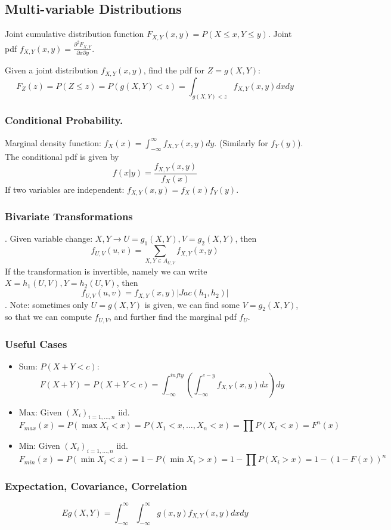 \documentclass[12pt]{amsart}
\numberwithin{equation}{section}
\theoremstyle{plain}
\theoremstyle{definition}
\begin{document}
\subsection{Multi-variable Distributions}
Joint cumulative distribution function $F_{X,Y}(x,y) = P(X\leq x, Y\leq y)$. Joint pdf $f_{X,Y}(x,y) = \frac{\partial^2F_{X,Y}}{\partial x\partial y}$.


Given a joint distribution $f_{X,Y}(x,y)$, find the pdf for $Z=g(X,Y)$:
$$
F_Z(z) = P(Z\leq z) = P(g(X,Y)<z)=\int_{g(X,Y)<z}f_{X,Y}(x,y)dxdy
$$

\subsubsection{Conditional Probability.}

Marginal density function: $f_X(x) = \int_{-\infty}^{\infty}f_{X,Y}(x,y)dy$. (Similarly for $f_Y(y)$). The conditional pdf is given by
$$
f(x|y) = \frac{f_{X,Y}(x,y)}{f_X(x)}
$$
If two variables are independent: $f_{X,Y}(x,y)=f_X(x)f_Y(y)$.

\subsubsection{Bivariate Transformations}. Given variable change: $X,Y\to U = g_1(X,Y), V=g_2(X,Y)$, then 
$$
f_{U,V}(u,v) = \sum_{X,Y\in A_{U,V}}f_{X,Y}(x,y)
$$
If the transformation is invertible, namely we can write $X = h_1(U,V), Y = h_2(U,V)$, then
$$
f_{U,V}(u,v) = f_{X,Y}(x,y)|Jac(h_1,h_2)|
$$.
Note: sometimes only $U = g(X,Y)$ is given, we can find some $V=g_2(X,Y)$, so that we can compute $f_{U,V}$, and further find the marginal pdf $f_U$.

\subsubsection{Useful Cases} 
\begin{itemize}
\item Sum: $P(X+Y<c)$:
$$
F(X+Y) = P(X+Y<c) = \int_{-\infty}^{infty}(\int_{-\infty}^{c-y}f_{X,Y}(x,y)dx)dy
$$
\item Max: Given $(X_i)_{i = 1,\ldots, n}$ iid. 
$$F_{max}(x) = P(\max X_i<x) = P(X_1<x, \ldots, X_n<x) = \prod P(X_i<x)=F^n(x)$$
\item Min: Given $(X_i)_{i = 1,\ldots, n}$ iid. 
$$
F_{min}(x) = P(\min X_i<x) = 1-P(\min X_i > x) = 1-\prod P(X_i>x) = 1-(1-F(x))^n
$$
\end{itemize}

\subsubsection{Expectation, Covariance, Correlation}
$$Eg(X,Y)=\int_{-\infty}^{\infty}\int_{-\infty}^{\infty}g(x,y)f_{X,Y}(x,y)dxdy$$
\end{document}
